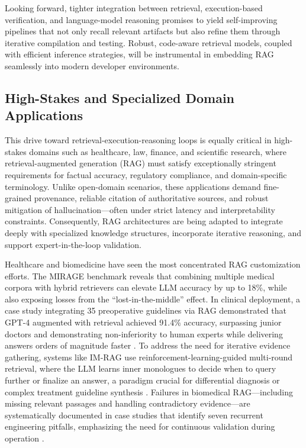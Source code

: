 \documentclass[11pt,a4paper]{article}
\begin{document}
Looking forward, tighter integration between retrieval, execution-based verification, and language-model reasoning promises to yield self-improving pipelines that not only recall relevant artifacts but also refine them through iterative compilation and testing. Robust, code-aware retrieval models, coupled with efficient inference strategies, will be instrumental in embedding RAG seamlessly into modern developer environments.


\subsection{High-Stakes and Specialized Domain Applications}


This drive toward retrieval-execution-reasoning loops is equally critical in high-stakes domains such as healthcare, law, finance, and scientific research, where retrieval-augmented generation (RAG) must satisfy exceptionally stringent requirements for factual accuracy, regulatory compliance, and domain-specific terminology. Unlike open-domain scenarios, these applications demand fine-grained provenance, reliable citation of authoritative sources, and robust mitigation of hallucination---often under strict latency and interpretability constraints. Consequently, RAG architectures are being adapted to integrate deeply with specialized knowledge structures, incorporate iterative reasoning, and support expert-in-the-loop validation.

Healthcare and biomedicine have seen the most concentrated RAG customization efforts. The MIRAGE benchmark \cite{arxiv:2402.13178v2} reveals that combining multiple medical corpora with hybrid retrievers can elevate LLM accuracy by up to 18\%, while also exposing losses from the ``lost-in-the-middle'' effect. In clinical deployment, a case study integrating 35 preoperative guidelines via RAG demonstrated that GPT-4 augmented with retrieval achieved 91.4\% accuracy, surpassing junior doctors and demonstrating non-inferiority to human experts while delivering answers orders of magnitude faster \cite{arxiv:2402.01733v1}. To address the need for iterative evidence gathering, systems like IM-RAG use reinforcement-learning-guided multi-round retrieval, where the LLM learns inner monologues to decide when to query further or finalize an answer, a paradigm crucial for differential diagnosis or complex treatment guideline synthesis \cite{arxiv:2405.13021v1}. Failures in biomedical RAG---including missing relevant passages and handling contradictory evidence---are systematically documented in case studies that identify seven recurrent engineering pitfalls, emphasizing the need for continuous validation during operation \cite{arxiv:2401.05856v1}.
\end{document}
